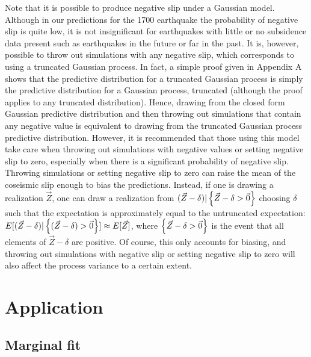 {Note that it is possible to produce negative slip under a Gaussian model.  Although in our predictions for the 1700 earthquake the probability of negative slip is quite low, it is not insignificant for earthquakes with little or no subsidence data present such as earthquakes in the future or far in the past.  It is, however, possible to throw out simulations with any negative slip, which corresponds to using a truncated Gaussian process.  In fact, a simple proof given in Appendix A shows that the predictive distribution for a truncated Gaussian process is simply the predictive distribution for a Gaussian process, truncated (although the proof applies to any truncated distribution).  Hence, drawing from the closed form Gaussian predictive distribution and then throwing out simulations that contain any negative value is equivalent to drawing from the truncated Gaussian process predictive distribution.  However, it is recommended that those using this model take care when throwing out simulations with negative values or setting negative slip to zero, especially when there is a significant probability of negative slip.  Throwing simulations or setting negative slip to zero can raise the mean of the coseismic slip enough to bias the predictions.  Instead, if one is drawing a realization $\vec{Z}$, one can draw a realization from $(\vec{Z} - \delta)  \vert \left\{\vec{Z} - \delta > \vec{0}\right\}$ choosing $\delta$ such that the expectation is approximately equal to the untruncated expectation: $E[(\vec{Z} - \delta) \vert \left\{(\vec{Z} - \delta) > \vec{0}\right\}] \approx E[\vec{Z}]$, where $\left\{\vec{Z} - \delta > \vec{0}\right\}$ is the event that all elements of $\vec{Z} - \delta$ are positive.   Of course, this only accounts for biasing, and throwing out simulations with negative slip or setting negative slip to zero will also affect the process variance to a certain extent.

\section{Application}
\label{application}

\FloatBarrier
\subsection{Marginal fit}
\label{marginalFit}

}
